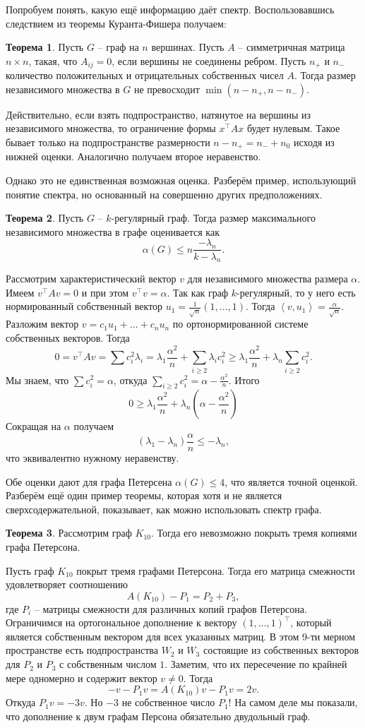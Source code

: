 \documentclass[10pt,a4paper,oneside]{book}
\theoremstyle{definition}
\newtheorem{thm}{{\color{red!40!black} Теорема}}
\def\lan{\left\langle }
\def\ran{\right\rangle}
\def\thrm{\begin{thm}}
\def\ethrm{\end{thm}}
\begin{document}
Попробуем понять, какую ещё информацию даёт спектр. Воспользовавшись следствием из теоремы Куранта-Фишера получаем:

\thrm Пусть $G$ -- граф на $n$ вершинах. Пусть $A$ -- симметричная матрица $n\times n$, такая, что $A_{ij}= 0$, если вершины не соединены ребром. Пусть $n_{+}$ и $n_{-}$ количество положительных и отрицательных собственных чисел $A$. Тогда размер независимого множества в $G$ не превосходит $\min(n-n_{+},n-n_{-})$.
\ethrm
\proof Действительно, если взять подпространство, натянутое на вершины из независимого множества, то ограничение формы $x^{\top}Ax$ будет нулевым. Такое бывает только на подпространстве размерности $n-n_{+}=n_{-}+n_0$ исходя из нижней оценки. Аналогично получаем второе неравенство.
\endproof

Однако это не единственная возможная оценка. Разберём пример, использующий понятие спектра, но основанный на совершенно других предположениях.



\thrm Пусть $G$ -- $k$-регулярный граф. Тогда размер максимального независимого множества в графе оценивается как $$\alpha(G)\leq n\frac{-\lambda_n}{k-\lambda_n}.$$
\ethrm
\proof Рассмотрим характеристический вектор $v$ для независимого множества размера $\alpha$. Имеем $v^{\top}Av=0$ и при этом $v^{\top}v=\alpha$. Так как граф $k$-регулярный, то у него есть нормированный собственный вектор $u_1=\frac{1}{\sqrt{n}}(1,\dots,1)$. Тогда $\lan v,u_1\ran = \frac{\alpha}{\sqrt{n}}$. Разложим вектор $v=c_1u_1 + \dots + c_n u_n$ по ортонормированной системе собственных векторов. Тогда
$$0=v^{\top}Av=\sum c_i^2 \lambda_i= \lambda_1\frac{\alpha^2}{n}+ \sum_{i\geq 2} \lambda_i c_i^2\geq \lambda_1\frac{\alpha^2}{n}+ \lambda_n \sum_{i\geq 2} c_i^2.$$
Мы знаем, что $\sum c_i^2=\alpha$, откуда $\sum_{i\geq 2} c_i^2=\alpha - \frac{\alpha^2}{n}$. Итого 
$$0\geq \lambda_1\frac{\alpha^2}{n}+\lambda_n(\alpha- \frac{\alpha^2}{n})$$
Сокращая на $\alpha$ получаем 
$$(\lambda_1-\lambda_n)\frac{\alpha}{n}\leq -\lambda_n,$$
что эквивалентно нужному неравенству.
\endproof

Обе оценки дают для графа Петерсена $\alpha(G)\leq 4$, что является точной оценкой. Разберём ещё один пример теоремы, которая хотя и не является сверхсодержательной, показывает, как можно использовать спектр графа.

\thrm Рассмотрим граф $K_{10}$. Тогда его невозможно покрыть тремя копиями графа Петерсона.
\ethrm
\proof Пусть граф $K_{10}$ покрыт тремя графами Петерсона. Тогда его матрица смежности удовлетворяет соотношению 
$$A(K_{10})-P_1=P_2+P_3,$$
где $P_i$ -- матрицы смежности для различных копий графов Петерсона. Ограничимся на ортогональное дополнение к вектору $(1,\dots,1)^{\top}$, который является собственным вектором для всех указанных матриц. В этом 9-ти мерном пространстве есть подпространства $W_2$ и $W_3$ состоящие из собственных векторов для $P_2$ и $P_3$ с собственным числом $1$. Заметим, что их пересечение по крайней мере одномерно и содержит вектор $v\neq 0$. Тогда $$-v-P_1v=A(K_{10})v-P_1v=2v.$$
Откуда $P_1v=-3v$. Но $-3$ не собственное число $P_1$! На самом деле мы показали, что дополнение к двум графам Персона обязательно двудольный граф.
\endproof
\end{document}
